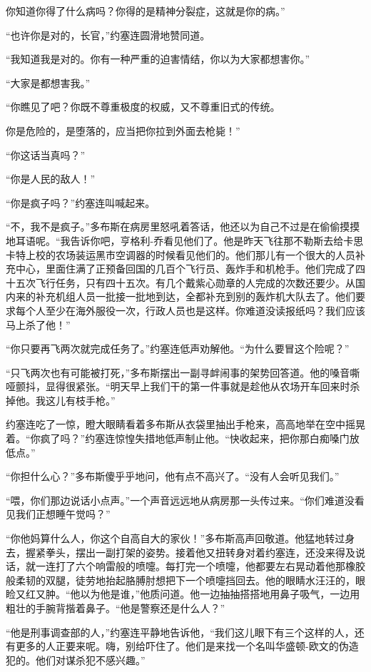     你知道你得了什么病吗？你得的是精神分裂症，这就是你的病。”

    “也许你是对的，长官，”约塞连圆滑地赞同道。

    “我知道我是对的。你有一种严重的迫害情结，你以为大家都想害你。”

    “大家是都想害我。”

    “你瞧见了吧？你既不尊重极度的权威，又不尊重旧式的传统。

    你是危险的，是堕落的，应当把你拉到外面去枪毙！”

    “你这话当真吗？”

    “你是人民的敌人！”

    “你是疯子吗？”约塞连叫喊起来。

    “不，我不是疯子。”多布斯在病房里怒吼着答话，他还以为自己不过是在偷偷摸摸地耳语呢。“我告诉你吧，亨格利-乔看见他们了。他是昨天飞往那不勒斯去给卡思卡特上校的农场装运黑市空调器的时候看见他们的。他们那儿有一个很大的人员补充中心，里面住满了正预备回国的几百个飞行员、轰炸手和机枪手。他们完成了四十五次飞行任务，只有四十五次。有几个戴紫心勋章的人完成的次数还要少。从国内来的补充机组人员一批接一批地到达，全都补充到别的轰炸机大队去了。他们要求每个人至少在海外服役一次，行政人员也是这样。你难道没读报纸吗？我们应该马上杀了他！”

    “你只要再飞两次就完成任务了。”约塞连低声劝解他。“为什么要冒这个险呢？”

    “只飞两次也有可能被打死，”多布斯摆出一副寻衅闹事的架势回答道。他的嗓音嘶哑颤抖，显得很紧张。“明天早上我们干的第一件事就是趁他从农场开车回来时杀掉他。我这儿有枝手枪。”

    约塞连吃了一惊，瞪大眼睛看着多布斯从衣袋里抽出手枪来，高高地举在空中摇晃着。“你疯了吗？”约塞连惊惶失措地低声制止他。“快收起来，把你那白痴嗓门放低点。”

    “你担什么心？”多布斯傻乎乎地问，他有点不高兴了。“没有人会听见我们。”

    “喂，你们那边说话小点声。”一个声音远远地从病房那一头传过来。“你们难道没看见我们正想睡午觉吗？”

    “你他妈算什么人，你这个自高自大的家伙！”多布斯高声回敬道。他猛地转过身去，握紧拳头，摆出一副打架的姿势。接着他又扭转身对着约塞连，还没来得及说话，就一连打了六个响雷般的喷嚏。每打完一个喷嚏，他都要左右晃动着他那橡胶般柔韧的双腿，徒劳地抬起胳膊肘想把下一个喷嚏挡回去。他的眼睛水汪汪的，眼睑又红又肿。“他以为他是谁，”他质问道。他一边抽抽搭搭地用鼻子吸气，一边用粗壮的手腕背揩着鼻子。“他是警察还是什么人？”

    “他是刑事调查部的人，”约塞连平静地告诉他，“我们这儿眼下有三个这样的人，还有更多的人正要来呢。嗨，别给吓住了。他们是来找一个名叫华盛顿-欧文的伪造犯的。他们对谋杀犯不感兴趣。”

